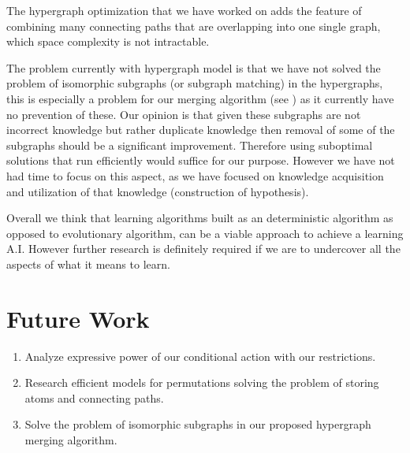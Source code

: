\documentclass[Master.tex]{subfiles}
\begin{document}
	
	The hypergraph optimization that we have worked on adds the feature of combining many connecting paths that are overlapping into one single graph, which space complexity is not intractable.
	
	The problem currently with hypergraph model is that we have not solved the problem of isomorphic subgraphs (or subgraph matching) in the hypergraphs, 
	this is especially a problem for our merging algorithm (see ) as it currently have no prevention of these.
	Our opinion is that given these subgraphs are not incorrect knowledge but rather duplicate knowledge then removal of some of the subgraphs should be a significant improvement.
	Therefore using suboptimal solutions that run efficiently would suffice for our purpose. 
	However we have not had time to focus on this aspect, as we have focused on knowledge acquisition and utilization of that knowledge (construction of hypothesis).
	
	
	Overall we think that learning algorithms built as an deterministic algorithm as opposed to evolutionary algorithm, can be a viable approach to achieve a learning A.I. However further research is definitely required if we are to undercover all the aspects of what it means to learn.
	
	
	
	
	
	

	\section{Future Work}
	
	\begin{enumerate}
		\item Analyze expressive power of our conditional action with our restrictions.
		\item Research efficient models for permutations solving the problem of storing atoms and connecting paths.
		\item Solve the problem of isomorphic subgraphs in our proposed hypergraph merging algorithm.
	\end{enumerate}
	
\end{document}
